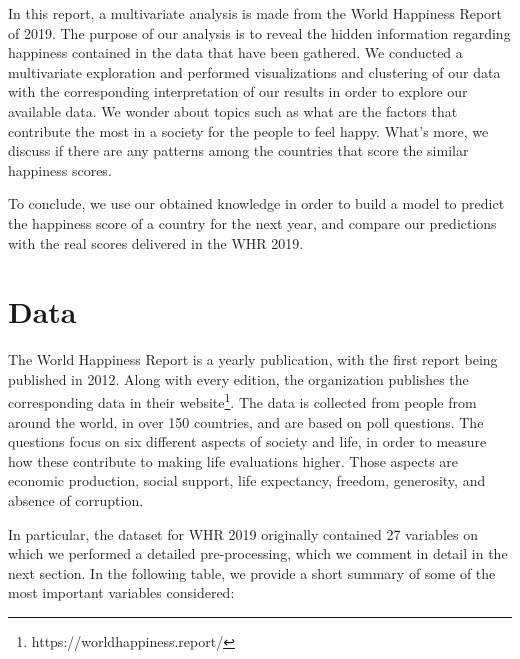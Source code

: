 \documentclass[12pt]{extarticle}
\begin{document}
In this report, a multivariate analysis is made from the World Happiness Report of 2019. The purpose of our analysis is to reveal the hidden information regarding happiness contained in the data that have been gathered. We conducted a multivariate exploration and performed visualizations and clustering of our data with the corresponding interpretation of our results in order to explore our available data. We wonder about topics such as what are the factors that contribute the most in a society for the people to feel happy. What’s more, we discuss if there are any patterns among the countries that score the similar happiness scores.

To conclude, we use our obtained knowledge in order to build a model to predict the happiness score of a country for the next year, and compare our predictions with the real scores delivered in the WHR 2019.



\newpage
\section{Data}

The World Happiness Report is a yearly publication, with the first report being published in 2012. Along with every edition, the organization publishes the corresponding data in their website\footnote{https://worldhappiness.report/}. The data is collected from people from around the world, in over 150 countries, and are based on poll questions. The questions focus on six different aspects of society and life, in order to measure how these contribute to making life evaluations higher. Those aspects are economic production, social support, life expectancy, freedom, generosity, and absence of corruption.

In particular, the dataset for WHR 2019 originally contained 27 variables on which we performed a detailed pre-processing, which we comment in detail in the next section. In the following table, we provide a short summary of some of the most important variables considered:
\end{document}
